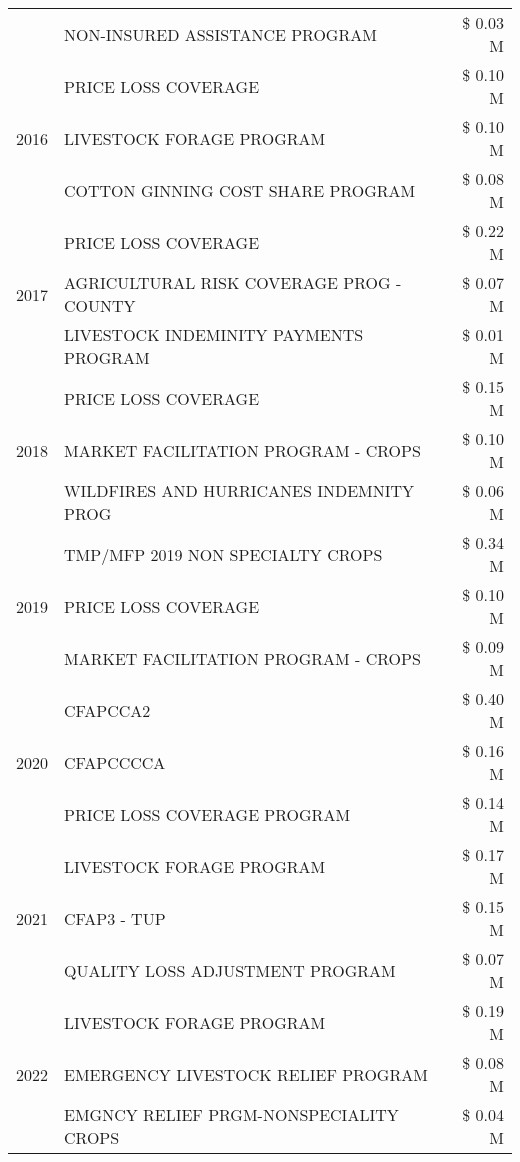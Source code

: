\begin{tabular}{llr}
 & NON-INSURED ASSISTANCE PROGRAM & \$ 0.03 M \\
\cline{1-3}
\multirow[t]{3}{*}{2016} & PRICE LOSS COVERAGE & \$ 0.10 M \\
 & LIVESTOCK FORAGE PROGRAM & \$ 0.10 M \\
 & COTTON GINNING COST SHARE PROGRAM & \$ 0.08 M \\
\cline{1-3}
\multirow[t]{3}{*}{2017} & PRICE LOSS COVERAGE & \$ 0.22 M \\
 & AGRICULTURAL RISK COVERAGE PROG - COUNTY & \$ 0.07 M \\
 & LIVESTOCK INDEMINITY PAYMENTS PROGRAM & \$ 0.01 M \\
\cline{1-3}
\multirow[t]{3}{*}{2018} & PRICE LOSS COVERAGE & \$ 0.15 M \\
 & MARKET FACILITATION PROGRAM - CROPS & \$ 0.10 M \\
 & WILDFIRES AND HURRICANES INDEMNITY PROG & \$ 0.06 M \\
\cline{1-3}
\multirow[t]{3}{*}{2019} & TMP/MFP 2019 NON SPECIALTY CROPS & \$ 0.34 M \\
 & PRICE LOSS COVERAGE & \$ 0.10 M \\
 & MARKET FACILITATION PROGRAM - CROPS & \$ 0.09 M \\
\cline{1-3}
\multirow[t]{3}{*}{2020} & CFAPCCA2 & \$ 0.40 M \\
 & CFAPCCCCA & \$ 0.16 M \\
 & PRICE LOSS COVERAGE PROGRAM & \$ 0.14 M \\
\cline{1-3}
\multirow[t]{3}{*}{2021} & LIVESTOCK FORAGE PROGRAM & \$ 0.17 M \\
 & CFAP3 - TUP & \$ 0.15 M \\
 & QUALITY LOSS ADJUSTMENT PROGRAM & \$ 0.07 M \\
\cline{1-3}
\multirow[t]{3}{*}{2022} & LIVESTOCK FORAGE PROGRAM & \$ 0.19 M \\
 & EMERGENCY LIVESTOCK RELIEF PROGRAM & \$ 0.08 M \\
 & EMGNCY RELIEF PRGM-NONSPECIALITY CROPS & \$ 0.04 M \\
\cline{1-3}
\bottomrule
\end{tabular}
